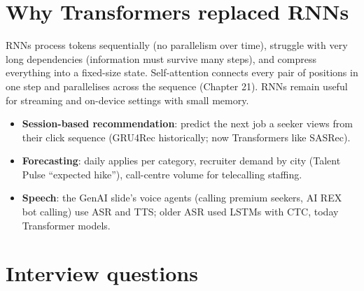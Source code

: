 \section{Why Transformers replaced RNNs}
RNNs process tokens sequentially (no parallelism over time), struggle with very long dependencies (information must survive many steps), and compress
everything into a fixed-size state. Self-attention connects every pair of positions in one step and parallelises across the sequence (Chapter 21). RNNs remain
useful for streaming and on-device settings with small memory.

\begin{practical}
\begin{itemize}
\item \textbf{Session-based recommendation}: predict the next job a seeker views from their click sequence (GRU4Rec historically; now Transformers like SASRec).
\item \textbf{Forecasting}: daily applies per category, recruiter demand by city (Talent Pulse ``expected hike''), call-centre volume for telecalling staffing.
\item \textbf{Speech}: the GenAI slide's voice agents (calling premium seekers, AI REX bot calling) use ASR and TTS; older ASR used LSTMs with CTC, today Transformer
  models.
\end{itemize}
\end{practical}

\section{Interview questions}

